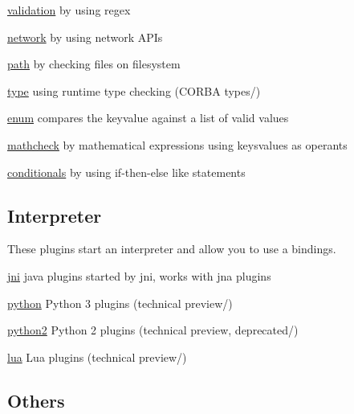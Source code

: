 \begin{DoxyItemize}
\item \hyperlink{md_src_plugins_validation_README_src_plugins_validation_README_md}{validation} by using regex
\item \hyperlink{md_src_plugins_network_README_src_plugins_network_README_md}{network} by using network A\+P\+Is
\item \hyperlink{md_src_plugins_path_README_src_plugins_path_README_md}{path} by checking files on filesystem
\item \hyperlink{md_src_plugins_type_README_src_plugins_type_README_md}{type} using runtime type checking (C\+O\+R\+B\+A types/)
\item \hyperlink{md_src_plugins_enum_README_src_plugins_enum_README_md}{enum} compares the keyvalue against a list of valid values
\item \hyperlink{md_src_plugins_mathcheck_README_src_plugins_mathcheck_README_md}{mathcheck} by mathematical expressions using keysvalues as operants
\item \hyperlink{md_src_plugins_conditionals_README_src_plugins_conditionals_README_md}{conditionals} by using if-\/then-\/else like statements
\end{DoxyItemize}

\subsection*{Interpreter}

These plugins start an interpreter and allow you to use a bindings.


\begin{DoxyItemize}
\item \hyperlink{md_src_plugins_jni_README_src_plugins_jni_README_md}{jni} java plugins started by jni, works with jna plugins
\item \hyperlink{md_src_plugins_python_README_src_plugins_python_README_md}{python} Python 3 plugins (technical preview/)
\item \hyperlink{md_src_plugins_python2_README_src_plugins_python2_README_md}{python2} Python 2 plugins (technical preview, deprecated/)
\item \hyperlink{md_src_plugins_lua_README_src_plugins_lua_README_md}{lua} Lua plugins (technical preview/)
\end{DoxyItemize}

\subsection*{Others}


